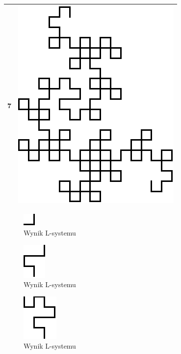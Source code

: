 \documentclass[a4paper,12pt,oneside]{book} %
\begin{document}
\begin{table}[h]
\begin{center}
\begin{tabular}{|c|c|}
			\hline
			7 & \includegraphics[scale=0.7]{grafika/example7} \\
			\hline
		\end{tabular}
	\end{center}
\end{table}

\begin{figure}[h]
	\centering
	\includegraphics[scale=0.7]{grafika/example1}
	\caption{Wynik L-systemu}
	\label{fig:dragoncurve}
\end{figure}


\begin{figure}[h]
	\centering
	\includegraphics[scale=0.7]{grafika/example2}
	\caption{Wynik L-systemu}
	\label{fig:dragoncurve}
\end{figure}

\begin{figure}[h]
	\centering
	\includegraphics[scale=0.7]{grafika/example3}
	\caption{Wynik L-systemu}
	\label{fig:dragoncurve}
\end{figure}
\end{document}
